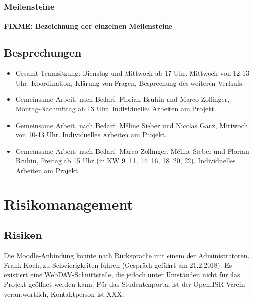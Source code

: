 \documentclass[a4paper]{article}
\begin{document}
\subsubsection{Meilensteine}
\paragraph{FIXME: Bezeichnung der einzelnen Meilensteine}

\subsection{Besprechungen}
\begin{itemize}
\item Gesamt-Teamsitzung: Dienstag und Mittwoch ab 17 Uhr, Mittwoch von 12-13 Uhr. Koordination, Klärung von Fragen, Besprechung des weiteren Verlaufs.
\item Gemeinsame Arbeit, nach Bedarf: Florian Bruhin und Marco Zollinger, Montag-Nachmittag ab 13 Uhr. Individuelles Arbeiten am Projekt.
\item Gemeinsame Arbeit, nach Bedarf: Méline Sieber und Nicolas Ganz, Mittwoch von 10-13 Uhr. Individuelles Arbeiten am Projekt.
\item Gemeinsame Arbeit, nach Bedarf: Marco Zollinger, Méline Sieber und Florian Bruhin, Freitag ab 15 Uhr (in KW 9, 11, 14, 16, 18, 20, 22). Individuelles Arbeiten am Projekt.
\end{itemize}

\section{Risikomanagement}
\subsection{Risiken}
Die Moodle-Anbindung könnte nach Rücksprache mit einem der Administratoren, Frank Koch, zu Schwierigkeiten führen (Gespräch geführt am 21.2.2018). Es existiert eine WebDAV-Schnittstelle, die jedoch unter Umständen nicht für das Projekt geöffnet werden kann. 
Für das Studentenportal ist der OpenHSR-Verein verantwortlich, Kontaktperson ist XXX.
\end{document}
